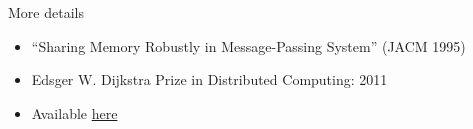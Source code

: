 \documentclass[xcolor=dvipsnames,compress]{beamer}
\newcommand{\wideitems}{\setlength\itemsep{2em}}
\begin{document}
\begin{frame}{More details}
  \vspace{1cm}
  \begin{itemize}
    \wideitems
    \item ``Sharing Memory Robustly in Message-Passing System'' (JACM 1995)
    \item Edsger W. Dijkstra Prize in Distributed Computing: 2011
    \item Available \href{http://www.cse.huji.ac.il/course/2004/dist/p124-attiya.pdf}{here}
  \end{itemize}
\end{frame}
\end{document}
